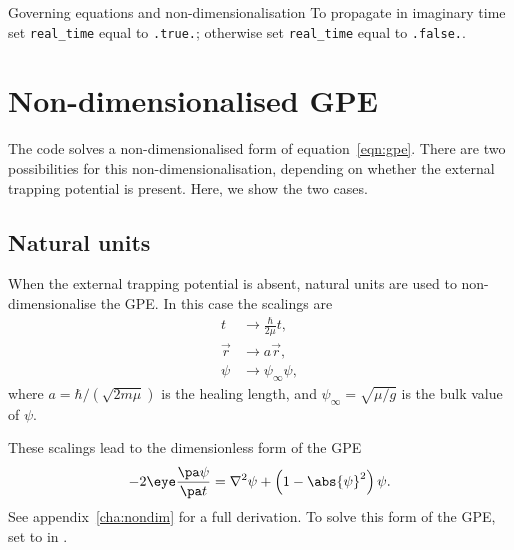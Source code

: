 \begin{chapter}{\label{cha:equations}Governing equations and
  non-dimensionalisation}
  To propagate in imaginary time set \verb"real_time" equal to \verb".true.";
  otherwise set \verb"real_time" equal to \verb".false.".

  \section{\label{sec:nondimgpe}Non-dimensionalised GPE}
  The code solves a non-dimensionalised form of equation~\eqref{eqn:gpe}.
  There are two possibilities for this non-dimensionalisation, depending on
  whether the external trapping potential is present.  Here, we show the two
  cases.

  \subsection{Natural units}
  When the external trapping potential is absent, natural units are used to
  non-dimensionalise the GPE.  In this case the scalings are
  \begin{equation}
    \begin{aligned}
      t       &\to \frac{\hbar}{2\mu}t, \\
      \vec{r} &\to a\vec{r}, \\
      \psi    &\to \psi_{\infty} \psi,
    \end{aligned}
    \label{eqn:natural_scalings}
  \end{equation}
  where $a = \hbar/(\sqrt{2m\mu})$ is the healing length, and $\psi_{\infty} =
  \sqrt{\mu/g}$ is the bulk value of $\psi$.

  These scalings lead to the dimensionless form of the GPE
  \begin{equation*}
    -2\eye\frac{\pa \psi}{\pa t} = \nabla^{2}\psi + \left(1 -
    \abs{\psi}^{2}\right)\psi.
  \end{equation*}
  See appendix~\ref{cha:nondim} for a full derivation.  To solve this form of
  the GPE, set  to  in .


\end{chapter}
